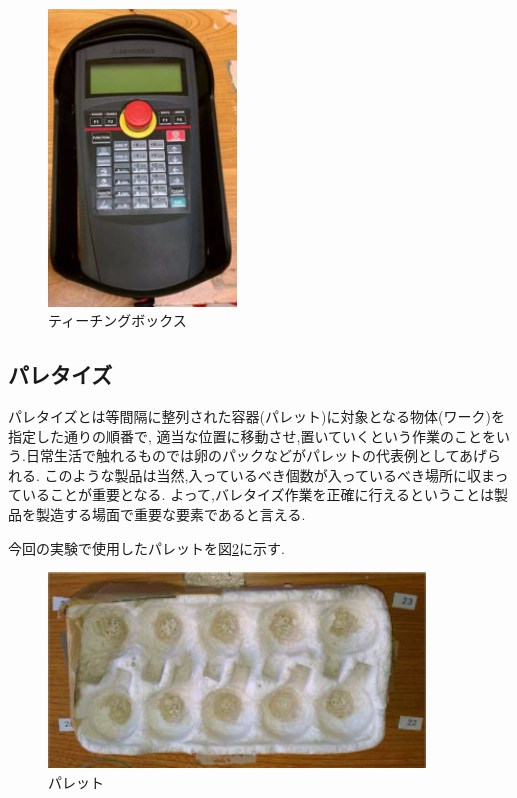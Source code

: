 \documentclass[a4paper,11pt]{jsarticle}
\begin{document}
\begin{figure}[H]
  \begin{center}
    \includegraphics[width = 5cm]{画像/ティーチングボックス.png}
    \caption{ティーチングボックス}
    \label{ティーチングボックス}
  \end{center}
\end{figure}

\subsection{パレタイズ}
パレタイズとは等間隔に整列された容器(パレット)に対象となる物体(ワーク)を指定した通りの順番で,
適当な位置に移動させ,置いていくという作業のことをいう.日常生活で触れるものでは卵のパックなどがパレットの代表例としてあげられる.
このような製品は当然,入っているべき個数が入っているべき場所に収まっていることが重要となる.
よって,バレタイズ作業を正確に行えるということは製品を製造する場面で重要な要素であると言える.
\par
今回の実験で使用したパレットを図\ref{パレット}に示す.
\begin{figure}[H]
  \begin{center}
    \includegraphics[width = 10cm]{画像/パレット.png}
    \caption{パレット}
    \label{パレット}
  \end{center}
\end{figure}
\end{document}
